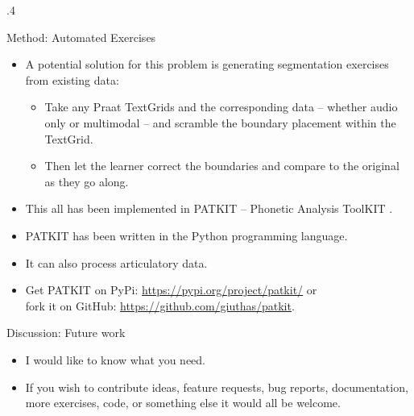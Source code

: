 \documentclass[final,hyperref={pdfpagelabels=false}]{beamer}
\begin{document}
\begin{frame}{}
\begin{columns}[t]
\begin{column}{.4\linewidth}
      \begin{block}{Method: Automated Exercises}
        \begin{itemize}
        \item A potential solution for this problem is generating segmentation
          exercises from existing data:
        \begin{itemize}
          \item Take any Praat TextGrids and the
            corresponding data -- whether audio only or multimodal -- and
            scramble the boundary placement within the TextGrid.
          \item Then let the learner correct the boundaries and compare to the
            original as they go along.
        \end{itemize} 
        \item This all has been implemented in PATKIT -- Phonetic Analysis
          ToolKIT \citep{PaloEtAl-PATKITPhoneticAnalysis-2026}.
        \item PATKIT has been written in the Python programming language.
        \item It can also process articulatory data.
        \item Get PATKIT on PyPi: \url{https://pypi.org/project/patkit/} or \\
        fork it on GitHub: \url{https://github.com/giuthas/patkit}.
        \end{itemize}
      \end{block}

      \begin{block}{Discussion: Future work}

        \begin{itemize}
        \item I would like to know what you need.
        \item If you wish to contribute ideas, feature requests, bug reports,
        documentation, more exercises, code, or something else it would all be
        welcome.
        \end{itemize}
      \end{block}


\end{column}
\end{columns}
\end{frame}
\end{document}
